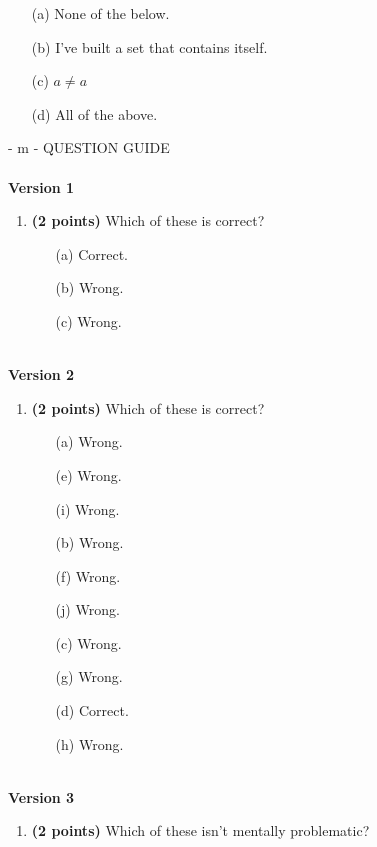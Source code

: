 \documentclass[12pt]{amsart}
\begin{document}
\begin{enumerate}[resume]
\begin{minipage}[t]{1.0\linewidth}\begin{itemize}\item[(a)]  None of the below.  \item[(b)]  I've built a set that contains itself. \item[(c)]  $a \neq a$ \item[(d)]   All of the above. \end{itemize}\end{minipage} \vfill \end{enumerate} - m - QUESTION GUIDE \\$ $ \\ {\bf Version 1} \\\begin{enumerate}[resume]
\item {\bf (2 points)} 
 Which of these is correct?

\begin{minipage}[t]{1.0\linewidth}\begin{multicols}{3}\begin{itemize}\item[(a)]  Correct. \item[(b)]  Wrong. \item[(c)]  Wrong. \end{itemize}\end{multicols}\end{minipage} \vfill \end{enumerate}$ $ \\ {\bf Version 2} \\\begin{enumerate}[resume]
\item {\bf (2 points)} 
 Which of these is correct?

\begin{minipage}[t]{1.0\linewidth}\begin{multicols}{4}\begin{itemize}\item[(a)]  Wrong. \item[(e)]  Wrong. \item[(i)]  Wrong. \item[(b)]  Wrong. \item[(f)]  Wrong. \item[(j)]  Wrong. \item[(c)]  Wrong. \item[(g)]  Wrong. \item[] \item[(d)]  Correct. \item[(h)]  Wrong. \item[] \end{itemize}\end{multicols}\end{minipage} \vfill \end{enumerate}$ $ \\ {\bf Version 3} \\\begin{enumerate}[resume]
\item {\bf (2 points)} 
 Which of these isn't mentally problematic?


\end{enumerate}
\end{document}
